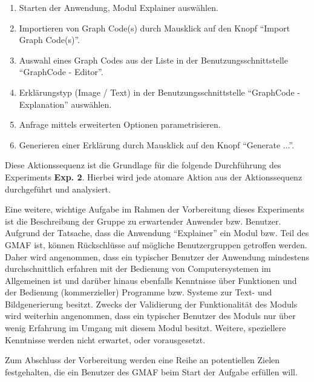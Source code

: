\begin{tcolorbox}[minipage, colback=white, colframe=black, arc=0pt, outer arc=0pt]
  \begin{enumerate}
    \setlength{\itemsep}{1pt}
    \item Starten der Anwendung, Modul Explainer auswählen.
    \item Importieren von Graph Code(s) durch Mausklick auf den Knopf \enquote{Import Graph Code(s)}.
    \item Auswahl eines Graph Codes aus der Liste in der Benutzungsschnittstelle \enquote{GraphCode - Editor}.
    \item Erklärungstyp (Image / Text) in der Benutzungsschnittstelle \enquote{GraphCode - Explanation} auswählen.
    \item Anfrage mittels erweiterten Optionen parametrisieren.
    \item Generieren einer Erklärung durch Mausklick auf den Knopf \enquote{Generate ...}.
  \end{enumerate}
\end{tcolorbox}

Diese Aktionssequenz ist die Grundlage für die folgende Durchführung des Experiments \textbf{Exp. 2}.
Hierbei wird jede atomare Aktion aus der Aktionssequenz durchgeführt und analysiert.

Eine weitere, wichtige Aufgabe im Rahmen der Vorbereitung dieses Experiments ist die Beschreibung der Gruppe zu erwartender Anwender bzw. Benutzer.
Aufgrund der Tatsache, dass die Anwendung \enquote{Explainer} ein Modul bzw. Teil des GMAF ist, können Rückschlüsse auf mögliche Benutzergruppen getroffen werden.
Daher wird angenommen, dass ein typischer Benutzer der Anwendung mindestens durchschnittlich erfahren mit der Bedienung von Computersystemen im Allgemeinen ist und darüber hinaus ebenfalls Kenntnisse über Funktionen und der Bedienung (kommerzieller) Programme bzw. Systeme zur Text- und Bildgenerierung besitzt.
Zwecks der Validierung der Funktionalität des Moduls wird weiterhin angenommen, dass ein typischer Benutzer des Moduls nur über wenig Erfahrung im Umgang mit diesem Modul besitzt.
Weitere, speziellere Kenntnisse werden nicht erwartet, oder vorausgesetzt.

Zum Abschluss der Vorbereitung werden eine Reihe an potentiellen Zielen festgehalten, die ein Benutzer des GMAF beim Start der Aufgabe erfüllen will.

